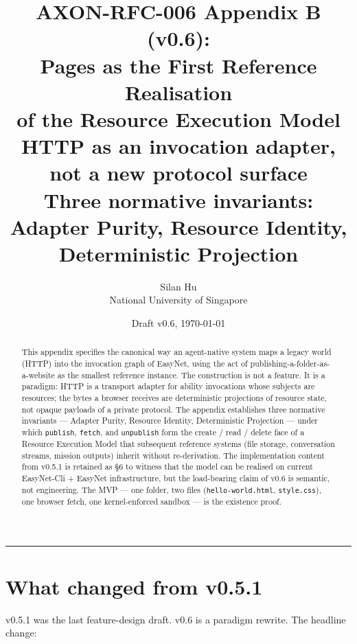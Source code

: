 \documentclass[11pt,a4paper]{article}
\title{
    \vspace{-2em}
    \textbf{\Large AXON-RFC-006 Appendix B (v0.6):}\\[0.2em]
    \textbf{\Large Pages as the First Reference Realisation\\[0.1em]
    of the Resource Execution Model}\\[0.4em]
    \large HTTP as an invocation adapter, not a new protocol surface\\
    \large Three normative invariants: Adapter Purity, Resource Identity,\\
    \large Deterministic Projection
}
\author{
    Silan Hu \\ \small National University of Singapore
}
\date{Draft v0.6, \today}
\theoremstyle{definition}
\begin{document}
\maketitle

\begin{abstract}
\noindent
This appendix specifies the canonical way an agent-native system
maps a legacy world (HTTP) into the invocation graph of EasyNet,
using the act of publishing-a-folder-as-a-website as the
smallest reference instance. The construction is not a feature.
It is a paradigm: HTTP is a transport adapter for ability
invocations whose subjects are resources; the bytes a browser
receives are deterministic projections of resource state, not
opaque payloads of a private protocol. The appendix establishes
three normative invariants --- Adapter Purity, Resource
Identity, Deterministic Projection --- under which
\texttt{publish}, \texttt{fetch}, and \texttt{unpublish} form
the create / read / delete face of a Resource Execution Model
that subsequent reference systems (file storage, conversation
streams, mission outputs) inherit without re-derivation. The
implementation content from v0.5.1 is retained as §6 to witness
that the model can be realised on current EasyNet-Cli + EasyNet
infrastructure, but the load-bearing claim of v0.6 is
semantic, not engineering. The MVP --- one folder, two files
(\texttt{hello-world.html}, \texttt{style.css}), one browser
fetch, one kernel-enforced sandbox --- is the existence proof.
\end{abstract}

\tableofcontents
\vspace{1em}
\hrule
\vspace{1em}

\section{What changed from v0.5.1}
\label{sec:v051-diff}

v0.5.1 was the last feature-design draft. v0.6 is a paradigm
rewrite. The headline change:
\end{document}
